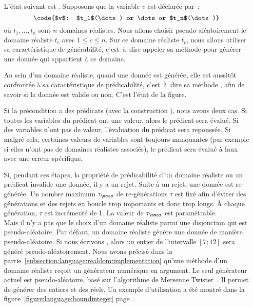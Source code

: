 L'état suivant est . Supposons que la variable $v$ est déclarée
par~:
%
$$\code{$v$: $t_1$(\dots) or \dots or $t_n$(\dots)}$$
%
où $t_1, \dots, t_n$ sont $n$ domaines réalistes. Nous allons choisir
pseudo-aléatoirement le domaine réaliste $t_c$ avec $1 \leq c \leq n$. Sur ce
domaine réaliste $t_c$, nous allons utiliser sa caractéristique de générabilité,
c'est~à~dire appeler sa méthode  pour générer une donnée qui
appartient à ce domaine.

Au sein d'un domaine réaliste, quand une donnée est générée, elle est aussitôt
confrontée à sa caractéristique de prédicabilité, c'est~à~dire sa méthode
, afin de savoir si la donnée est valide ou non. C'est l'état
 de la figure.

Si la précondition a des prédicats (avec la construction ), nous avons
deux cas. Si toutes les variables du prédicat ont une valeur, alors le prédicat
sera évalué. Si des variables n'ont pas de valeur, l'évaluation du prédicat sera
repoussée. Si malgré cela, certaines valeurs de variables sont toujours
manquantes (par exemple si elles n'ont pas de domaines réalistes associés), le
prédicat sera évalué à faux avec une erreur spécifique.

Si, pendant ces étapes, la propriété de prédicabilité d'un domaine réaliste ou
un prédicat invalide une donnée, il y a un {\strong rejet}. Suite à un rejet,
une donnée est re-générée. Un nombre maximum $\tau_{\mmax}$ de re-générations
$\tau$ est fixé afin d'éviter des générations et des rejets en boucle trop
importants et donc trop longs. À chaque génération, $\tau$ est incrémenté de 1.
La valeur de $\tau_{\mmax}$ est paramétrable. \\

Mais il n'y a pas que le choix d'un domaine réaliste parmi une disjonction qui
est pseudo-aléatoire. Par défaut, un domaine réaliste génère une donnée de
manière pseudo-aléatoire.  Si nous écrivons , alors un
entier de l'intervalle $[7; 42]$ sera généré pseudo-aléatoirement. Nous avons
précisé dans la partie~\ref{subsection:language:realdom:implementation} qu'une
méthode  d'un domaine réaliste reçoit un générateur numérique en
argument. Le seul générateur actuel est pseudo-aléatoire, basé sur l'algorithme
de Mersenne Twister~. Il permet de générer des entiers et
des réels. Un exemple d'utilisation a été montré dans la
figure~\ref{figure:language:boundinteger}
page~\pageref{figure:language:boundinteger}.

